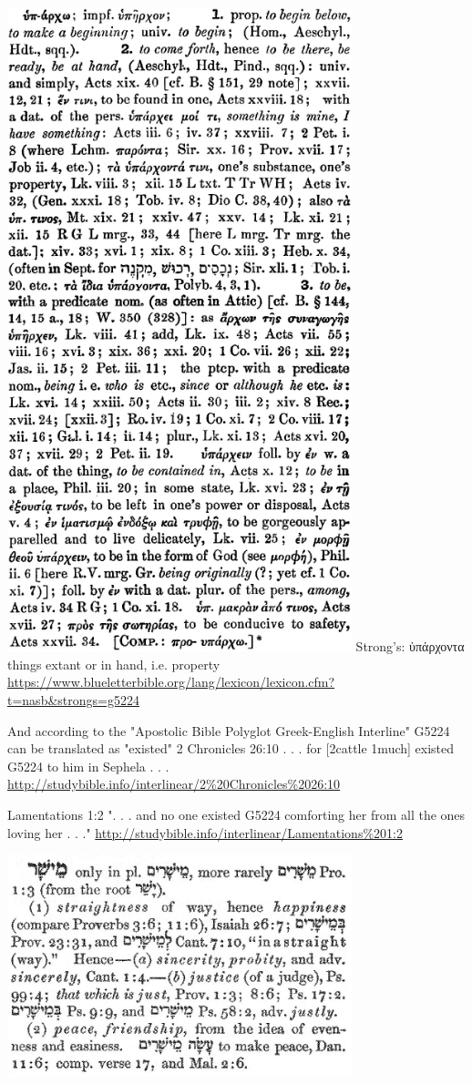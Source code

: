 \documentclass[11pt]{article}
\begin{document}
\begin{thebibliography}{37}
\includegraphics[width=10cm]{possessions}
Strong's:
ὑπάρχοντα
things extant or in hand, i.e. property 
\url{https://www.blueletterbible.org/lang/lexicon/lexicon.cfm?t=nasb&strongs=g5224}

And according to the "Apostolic Bible Polyglot Greek-English Interline" G5224 can be translated as "existed"
2 Chronicles 26:10
. . . for [2cattle 1much] existed G5224 to him in Sephela . . .
\url{http://studybible.info/interlinear/2%20Chronicles%2026:10}

Lamentations 1:2
". . . and no one existed G5224 comforting her from all the ones loving her . . ."
\url{http://studybible.info/interlinear/Lamentations%201:2}


\includegraphics[width=10cm]{gesenius_h4339} 
 

\end{thebibliography}
\end{document}
